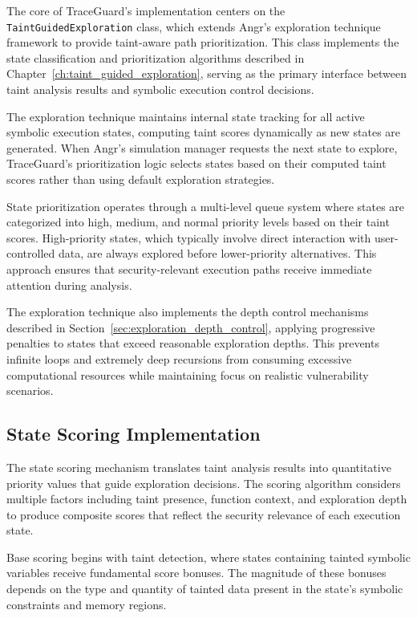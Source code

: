The core of TraceGuard's implementation centers on the \texttt{TaintGuidedExploration} class, which extends Angr's exploration technique framework to provide taint-aware path prioritization. This class implements the state classification and prioritization algorithms described in Chapter~\ref{ch:taint_guided_exploration}, serving as the primary interface between taint analysis results and symbolic execution control decisions.

The exploration technique maintains internal state tracking for all active symbolic execution states, computing taint scores dynamically as new states are generated. When Angr's simulation manager requests the next state to explore, TraceGuard's prioritization logic selects states based on their computed taint scores rather than using default exploration strategies.

State prioritization operates through a multi-level queue system where states are categorized into high, medium, and normal priority levels based on their taint scores. High-priority states, which typically involve direct interaction with user-controlled data, are always explored before lower-priority alternatives. This approach ensures that security-relevant execution paths receive immediate attention during analysis.

The exploration technique also implements the depth control mechanisms described in Section~\ref{sec:exploration_depth_control}, applying progressive penalties to states that exceed reasonable exploration depths. This prevents infinite loops and extremely deep recursions from consuming excessive computational resources while maintaining focus on realistic vulnerability scenarios.

\subsection{State Scoring Implementation}

The state scoring mechanism translates taint analysis results into quantitative priority values that guide exploration decisions. The scoring algorithm considers multiple factors including taint presence, function context, and exploration depth to produce composite scores that reflect the security relevance of each execution state.

Base scoring begins with taint detection, where states containing tainted symbolic variables receive fundamental score bonuses. The magnitude of these bonuses depends on the type and quantity of tainted data present in the state's symbolic constraints and memory regions.

